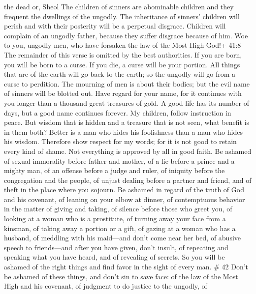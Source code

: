 the dead or, Sheol  The children of sinners are abominable
children and they frequent the dwellings of the ungodly. 
The inheritance of sinners' children will perish and with their
posterity will be a perpetual disgrace.  Children will
complain of an ungodly father, because they suffer disgrace because of
him.  Woe to you, ungodly men, who have forsaken the law of
the Most High God!+ 41:8 The remainder of this verse is omitted by the
best authorities.  If you are born, you will be born to a
curse. If you die, a curse will be your portion.  All
things that are of the earth will go back to the earth; so the ungodly
will go from a curse to perdition.  The mourning of men is
about their bodies; but the evil name of sinners will be blotted out.
 Have regard for your name, for it continues with you
longer than a thousand great treasures of gold.  A good
life has its number of days, but a good name continues forever.
 My children, follow instruction in peace. But wisdom that
is hidden and a treasure that is not seen, what benefit is in them both?
 Better is a man who hides his foolishness than a man who
hides his wisdom.  Therefore show respect for my words; for
it is not good to retain every kind of shame. Not everything is approved
by all in good faith.  Be ashamed of sexual immorality
before father and mother, of a lie before a prince and a mighty man,
 of an offense before a judge and ruler, of iniquity before
the congregation and the people, of unjust dealing before a partner and
friend,  and of theft in the place where you sojourn. Be
ashamed in regard of the truth of God and his covenant, of leaning on
your elbow at dinner, of contemptuous behavior in the matter of giving
and taking,  of silence before those who greet you, of
looking at a woman who is a prostitute,  of turning away
your face from a kinsman, of taking away a portion or a gift, of gazing
at a woman who has a husband,  of meddling with his
maid---and don't come near her bed, of abusive speech to friends---and
after you have given, don't insult,  of repeating and
speaking what you have heard, and of revealing of secrets. 
So you will be ashamed of the right things and find favor in the sight
of every man. \# 42  Don't be ashamed of these things, and
don't sin to save face:  of the law of the Most High and his
covenant, of judgment to do justice to the ungodly,  of
